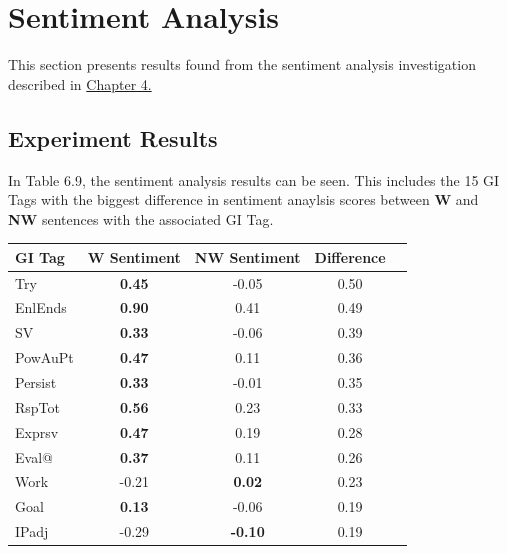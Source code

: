 \documentclass[oneside,12pt]{Classes/RoboticsLaTeX}
\begin{document}
\section{Sentiment Analysis}
This section presents results found from the sentiment analysis investigation described in \hyperref[chap:methodology]{Chapter 4.}
\subsection{Experiment Results}
In Table 6.9, the sentiment analysis results can be seen. This includes the 15 GI Tags with the biggest difference in sentiment anaylsis scores between \textbf{W} and \textbf{NW} sentences with the associated GI Tag.
\begin{table}[!h]
  \begin{adjustbox}{center,max width=\linewidth}
    \begin{tabular}{l|cccc}
      \toprule
      \bf GI Tag & \bf{W Sentiment} & \bf{NW Sentiment}& \bf{Difference}                     \\
      \midrule
      Try             & \textbf{0.45}              & -0.05           & 0.50                  \\
      EnlEnds         & \textbf{0.90}              & 0.41            & 0.49                  \\
      SV              & \textbf{0.33}              & -0.06           & 0.39                  \\
      PowAuPt         & \textbf{0.47}              & 0.11            & 0.36                  \\
      Persist         & \textbf{0.33}              & -0.01           & 0.35                  \\
      RspTot          & \textbf{0.56}              & 0.23            & 0.33                  \\
      Exprsv          & \textbf{0.47}              & 0.19            & 0.28                  \\
      Eval@           & \textbf{0.37}              & 0.11            & 0.26                  \\
      Work            & -0.21             & \textbf{0.02}            & 0.23                  \\
      Goal            & \textbf{0.13}              &-0.06            & 0.19                  \\
      IPadj           & -0.29             & \textbf{-0.10}           & 0.19                  \\

\end{tabular}
\end{adjustbox}
\end{table}
\end{document}
